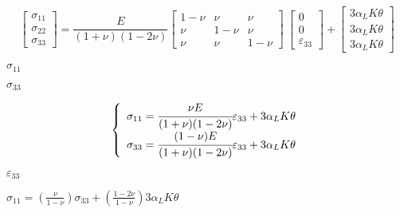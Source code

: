 \documentclass[onecolumn,11pt]{report}
\def\lthtmlcheckvsize{\ifdim\ht\sizebox<\vsize 
  \ifdim\wd\sizebox<\hsize\expandafter\hfill\fi \expandafter\vfill
  \else\expandafter\vss\fi}%
\begin{document}
{\newpage\clearpage
{}%
\begin{displaymath}%
	\left[
\begin{array} {c}
\sigma_{11} \\
\sigma_{22} \\
\sigma_{33}
\end{array}
\right]
=
\frac{E}{(1+\nu)(1-2\nu)}
\left[
\begin{array}{ccc}
1-\nu & \nu & \nu \\
\nu & 1-\nu & \nu \\
\nu & \nu & 1-\nu
\end{array}
\right]
\:
\left[
\begin{array} {c}
0 \\
0 \\
\varepsilon_{33}
\end{array}
\right]
+
\left[
\begin{array} {c}
3 \alpha_L K \theta \\
3 \alpha_L K \theta \\
3 \alpha_L K \theta
\end{array}
\right]\end{displaymath}%
\lthtmldisplayZ
\lthtmlcheckvsize\clearpage}

{\newpage\clearpage
{}%
$ \sigma_{11}$%
\lthtmlindisplaymathZ
\lthtmlcheckvsize\clearpage}

{\newpage\clearpage
{}%
$ \sigma_{33}$%
\lthtmlindisplaymathZ
\lthtmlcheckvsize\clearpage}

{\newpage\clearpage
{}%
\begin{displaymath}\left\lbrace
\begin{array} {ll}
\sigma_{11} =  \cfrac{\nu E}{(1+\nu)(1-2\nu)} \varepsilon_{33} + 3 \alpha_L K \theta \\
\sigma_{33} =  \cfrac{(1-\nu) E}{(1+\nu)(1-2\nu)} \varepsilon_{33} + 3 \alpha_L K \theta
\end{array}
\right.\end{displaymath}%
\lthtmldisplayZ
\lthtmlcheckvsize\clearpage}

{\newpage\clearpage
{}%
$ \varepsilon_{33}$%
\lthtmlindisplaymathZ
\lthtmlcheckvsize\clearpage}

{\newpage\clearpage
{}%
$\displaystyle \sigma_{11} =   \left( \frac{\nu}{1-\nu} \right) \sigma_{33} + \left( \frac{1-2\nu}{1-\nu} \right) 3 \alpha_L K \theta$%
\lthtmlindisplaymathZ
\lthtmlcheckvsize\clearpage}
\end{document}
